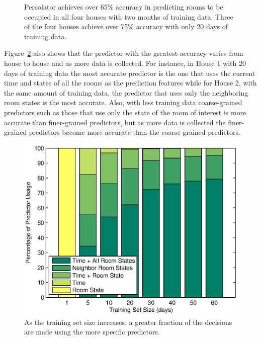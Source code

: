 \begin{figure}
{{\label{fig:houseF_accuracy}
}
\caption[Accuracy of Percolator compared to its component predictors]{Percolator
achieves over 65\% accuracy in predicting rooms to be occupied in all four
houses with two months of training data. Three of the four houses achieve
over 75\% accuracy with only 20 days of training data.}
\label{fig:trainingSetSizeVsPredictorSelection}
}
\end{figure}

Figure~\ref{fig:trainingSetSizeModelUsage} also shows that the predictor with
the greatest accuracy varies from house to house and as more data is
collected. For instance, in House 1 with 20 days of training data the most
accurate predictor is the one that uses the current time and states of all the
rooms as the prediction features while for House 2, with the same amount of
training data, the predictor that uses only the neighboring room states is the
most accurate. Also, with less training data coarse-grained predictors such as
those that use only the state of the room of interest is more accurate than
finer-grained predictors, but as more data is collected the finer-grained
predictors become more accurate than the coarse-grained predictors.


\begin{figure}[!htb]
\begin{center}
\includegraphics[width=0.6\columnwidth]{fig/trainingSetSizeModelUsage.eps}
\end{center}
\caption[Effect of training set size on predictor selection]{As the training set
size increases, a greater fraction of the decisions are made using the more
specific predictors.}
\label{fig:trainingSetSizeModelUsage}
\end{figure}

